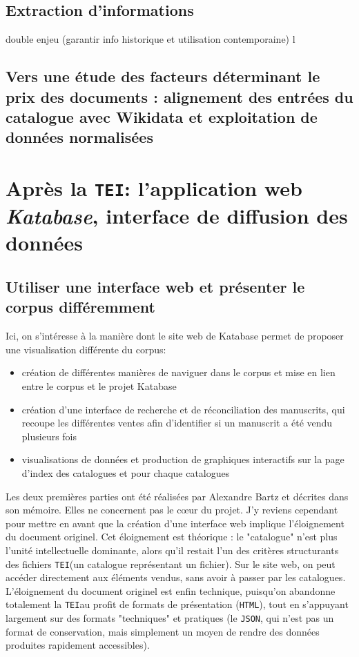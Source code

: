 \documentclass[a4paper, 12pt, twoside]{book}
\newcommand{\html}{\texttt{HTML}}
\newcommand{\json}{\texttt{JSON}}
\newcommand{\tei}{\texttt{TEI}}
\begin{document}
\chapter{Extraction d'informations}
double enjeu (garantir info historique et utilisation contemporaine)
l

\chapter{Vers une étude des facteurs déterminant le prix des documents : alignement des entrées du catalogue avec Wikidata et exploitation de données normalisées}





\part{Après la \tei : l'application web \textit{Katabase}, interface de diffusion des données}
\chapter{Utiliser une interface web et présenter le corpus différemment}
Ici, on s'intéresse à la manière dont le site web de Katabase permet de proposer une visualisation différente du corpus:

\begin{itemize}
	\item{création de différentes manières de naviguer dans le corpus et mise en lien entre le corpus et le projet Katabase}
	\item{création d'une interface de recherche et de réconciliation des manuscrits, qui recoupe les différentes ventes afin d'identifier si un manuscrit a été vendu plusieurs fois}
	\item{visualisations de données et production de graphiques interactifs sur la page d'index des catalogues et pour chaque catalogues}
\end{itemize}

Les deux premières parties ont été réalisées par Alexandre Bartz et décrites dans son mémoire. Elles ne concernent pas le cœur du projet. J'y reviens cependant pour mettre en avant que la création d'une interface web implique l'éloignement du document originel. Cet éloignement est théorique : le "catalogue" n'est plus l'unité intellectuelle dominante, alors qu'il restait l'un des critères structurants des fichiers \tei (un catalogue représentant un fichier). Sur le site web, on peut accéder directement aux éléments vendus, sans avoir à passer par les catalogues. L'éloignement du document originel est enfin technique, puisqu'on abandonne totalement la \tei au profit de formats de présentation (\html), tout en s'appuyant largement sur des formats "techniques" et pratiques (le \json, qui n'est pas un format de conservation, mais simplement un moyen de rendre des données produites rapidement accessibles).
\end{document}
